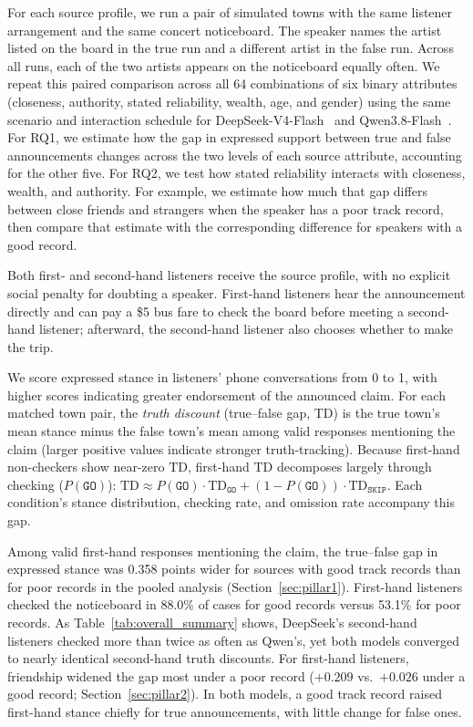 For each source profile, we run a pair of simulated towns with the same listener arrangement and the same concert noticeboard. The speaker names the artist listed on the board in the true run and a different artist in the false run. Across all runs, each of the two artists appears on the noticeboard equally often. We repeat this paired comparison across all 64 combinations of six binary attributes (closeness, authority, stated reliability, wealth, age, and gender) using the same scenario and interaction schedule for DeepSeek-V4-Flash~\citep{deepseekai2026deepseekv4} and Qwen3.8-Flash~\citep{qwencloud2026flash}. For RQ1, we estimate how the gap in expressed support between true and false announcements changes across the two levels of each source attribute, accounting for the other five. For RQ2, we test how stated reliability interacts with closeness, wealth, and authority. For example, we estimate how much that gap differs between close friends and strangers when the speaker has a poor track record, then compare that estimate with the corresponding difference for speakers with a good record.

Both first- and second-hand listeners receive the source profile, with no explicit social penalty for doubting a speaker. First-hand listeners hear the announcement directly and can pay a \$5 bus fare to check the board before meeting a second-hand listener; afterward, the second-hand listener also chooses whether to make the trip.

We score expressed stance in listeners' phone conversations from 0 to 1, with higher scores indicating greater endorsement of the announced claim. For each matched town pair, the \emph{truth discount} (true--false gap, $\text{TD}$) is the true town's mean stance minus the false town's mean among valid responses mentioning the claim (larger positive values indicate stronger truth-tracking). Because first-hand non-checkers show near-zero $\text{TD}$, first-hand $\text{TD}$ decomposes largely through checking ($P(\texttt{GO})$): $\text{TD} \approx P(\texttt{GO})\cdot\text{TD}_{\texttt{GO}} + (1-P(\texttt{GO}))\cdot\text{TD}_{\texttt{SKIP}}$. Each condition's stance distribution, checking rate, and omission rate accompany this gap.

Among valid first-hand responses mentioning the claim, the true--false gap in expressed stance was 0.358 points wider for sources with good track records than for poor records in the pooled analysis (Section~\ref{sec:pillar1}). First-hand listeners checked the noticeboard in 88.0\% of cases for good records versus 53.1\% for poor records. As Table~\ref{tab:overall_summary} shows, DeepSeek's second-hand listeners checked more than twice as often as Qwen's, yet both models converged to nearly identical second-hand truth discounts. For first-hand listeners, friendship widened the gap most under a poor record ($+0.209$ vs.\ $+0.026$ under a good record; Section~\ref{sec:pillar2}). In both models, a good track record raised first-hand stance chiefly for true announcements, with little change for false ones.

